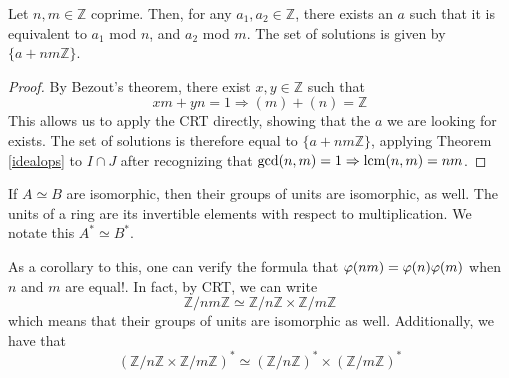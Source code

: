 \begin{corollary}
  Let $n, m \in \mathbb{Z}$ coprime. Then, for any $a_1, a_2 \in \mathbb{Z}$, there exists an $a$ such that it is equivalent to $a_1$ mod $n$, and $a_2$ mod $m$. The set of solutions is given by $\{a + nm\mathbb{Z}\}$. 
\end{corollary}
\begin{proof}
  By Bezout's theorem, there exist $x, y \in \mathbb{Z}$ such that 
  \[
    xm + yn = 1 \Rightarrow (m) + (n) = \mathbb{Z}
  \]
  This allows us to apply the CRT directly, showing that the $a$ we are looking for exists. The set of solutions is therefore equal to $\{a + nm\mathbb{Z}\}$, applying Theorem \ref{idealops} to $I \cap J$ after recognizing that $\gcd(n, m) = 1 \Rightarrow \operatorname{lcm}(n, m) = nm$. 
\end{proof}


\begin{theorem*}
  If $A \simeq B$ are isomorphic, then their groups of units are isomorphic, as well. The units of a ring are its invertible elements with respect to multiplication. We notate this $A^* \simeq B^*$. 
\end{theorem*}

As a corollary to this, one can verify the formula that $\varphi(nm) = \varphi(n) \varphi(m)$ when $n$ and $m$ are equal!. In fact, by CRT, we can write
\[
  \mathbb{Z}/nm\mathbb{Z} \simeq \mathbb{Z}/n\mathbb{Z} \times \mathbb{Z}/m\mathbb{Z}
\]
which means that their groups of units are isomorphic as well. Additionally, we have that 
\[
  \left(\mathbb{Z}/n\mathbb{Z} \times \mathbb{Z}/m\mathbb{Z}\right)^* \simeq \left(\mathbb{Z}/n\mathbb{Z}\right)^* \times \left(\mathbb{Z}/m\mathbb{Z}\right)^*
\]

